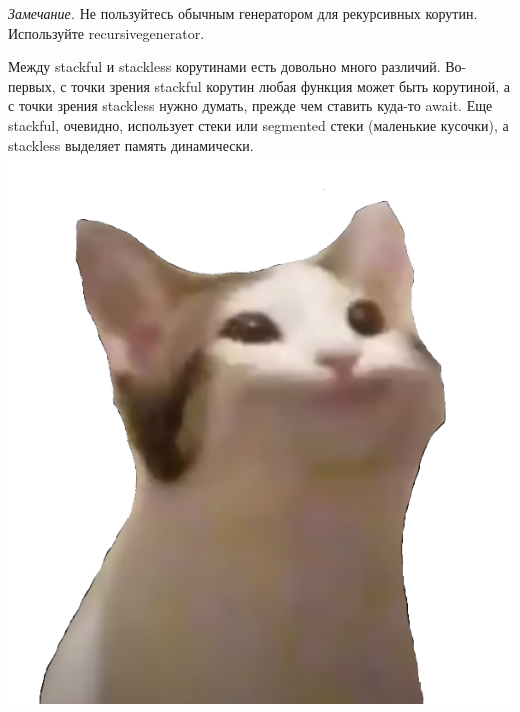 \documentclass[12pt, a4paper]{article}
\begin{document}
\textit{Замечание.} Не пользуйтесь обычным генератором для рекурсивных корутин. Используйте recursive\textunderscore generator.\\
\par Между stackful и stackless корутинами есть довольно много различий. Во-первых, с точки зрения stackful корутин любая функция может быть корутиной, а с точки зрения stackless нужно думать, прежде чем ставить куда-то await. Еще stackful, очевидно, использует стеки или segmented стеки (маленькие кусочки), а stackless выделяет память динамически.\\
\includegraphics[scale=0.6]{pop_cat.png}
\end{document}
